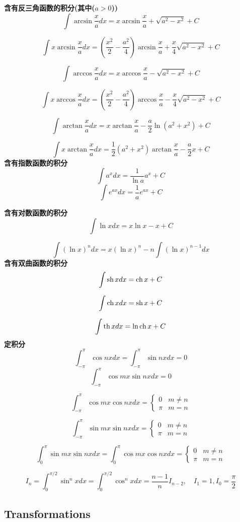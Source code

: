 \documentclass{article}
\begin{document}
\textbf{含有反三角函数的积分(其中($a>0$))}
$$
\int \arcsin \frac{x}{a}dx=x\arcsin \frac{x}{a}+\sqrt{a^2-x^2}+C
$$

$$
\int x\arcsin \frac{x}{a}dx=(\frac{x^2}{2}-\frac{ a^2}{4})\arcsin \frac{x}{a}+ \frac{x}{4}\sqrt{a^2-x^2}+C
$$

$$
\int \arccos \frac{x}{a}dx=x \arccos \frac{x}{a}-\sqrt{a^2-x^2}+C
$$

$$
\int x\arccos \frac{x}{a}dx=(\frac{x^2}{2}-\frac{ a^2}{4})\arccos \frac{x}{a}- \frac{x}{4}\sqrt{a^2-x^2}+C
$$

$$
\int \arctan \frac{x}{a}dx=x \arctan \frac{x}{a}-\frac{a}{2}\ln(a^2+x^2)+C
$$

$$
\int x \arctan \frac{x}{a}dx=\frac{1}{2}(a^2+x^2)\arctan \frac{x}{a}- \frac{a}{2}x+C
$$
\textbf{含有指数函数的积分}
$$
\int a^xdx=\frac{1}{\ln a}a^x+C
$$
$$
\int e^{ax}dx=\frac{ 1}{a}e^{ax}+C
$$

\textbf{含有对数函数的积分}
$$
\int \ln xdx=x\ln x-x +C
$$

$$
\int (\ln x)^n dx=x(\ln x)^n -n \int (\ln x)^{n-1}dx
$$
\textbf{含有双曲函数的积分}
$$
\int \operatorname{sh} xdx=\operatorname{ch} x+C
$$

$$
\int \operatorname{ch} xdx=\operatorname{sh} x+C
$$

$$
\int \operatorname{th} xdx=\ln \operatorname{ch} x+C
$$
\textbf{定积分}
$$
\int_{-\pi}^{\pi} \cos nx dx=
\int_{-\pi}^{\pi} \sin nx dx=0
$$
$$
\int_{-\pi}^{\pi} \cos mx\sin nx dx=0
$$

$$
\int_{-\pi}^{\pi} \cos mx\cos nx dx=
\left\{
		\begin{array}{ll}
		 0 & m \neq n \\
		 \pi & m = n
		\end{array}
		\right.
$$

$$
\int_{-\pi}^{\pi} \sin mx\sin nx dx=
\left\{
		\begin{array}{ll}
		 0 & m \neq n \\
		 \pi & m = n
		\end{array}
		\right.
$$

$$
\int_{0}^{\pi} \sin mx\sin nx dx=
\int_{0}^{\pi} \cos mx\cos nx dx=
\left\{
		\begin{array}{ll}
		 0 & m \neq n \\
		 \pi & m = n
		\end{array}
		\right.
$$

$$
I_n=\int_{0}^{\pi/2} \sin^n xdx=\int_{0}^{\pi/2}\cos^n xdx=\frac{n-1}{n}I_{n-2},\quad
I_1=1, I_0=\frac{ \pi}{2}
$$

\subsection{Transformations}
\end{document}
